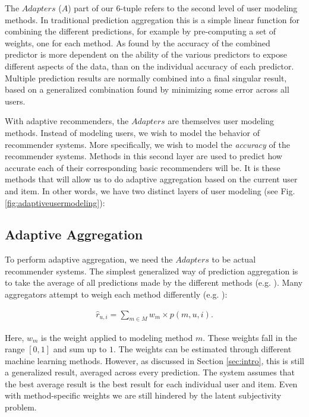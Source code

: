The $Adapters$ ($A$) part of our 6-tuple refers to the second level of user modeling methods.
In traditional prediction aggregation this is a simple linear function for combining the different predictions,
for example by pre-computing a set of weights, one for each method.
As found by \cite[p.6]{Bell2007} the accuracy of the combined predictor is more dependent on the 
ability of the various predictors to expose different aspects of the data, than on 
the individual accuracy of each predictor.
Multiple prediction results are normally combined into a final singular result,
based on a generalized combination found by minimizing some error across all users.

With adaptive recommenders, the $Adapters$ are themselves user modeling methods.
Instead of modeling users, we wish to model the behavior of recommender systems.
More specifically, we wish to model the \emph{accuracy} of the recommender systems.
Methods in this second layer are used to predict how accurate each of their corresponding basic recommenders will be.
It is these methods that will allow us to do adaptive aggregation based on the current user and item.
In other words, we have two distinct layers of user modeling 
(see Fig. \ref{fig:adaptiveusermodeling}):



\subsection{Adaptive Aggregation}

To perform adaptive aggregation, we need the $Adapters$ to be actual recommender systems.
The simplest generalized way of prediction aggregation is to take the average of all predictions made
by the different methods (e.g. \cite[p.3]{Aslam2001}).
Many aggregators attempt to weigh each method differently (e.g. \cite{Claypool1999}):

\begin{eqnarray*}
  \hat{r}_{u,i} = \sum_{m \in M} w_{m} \times p(m,u,i).
\end{eqnarray*}

Here, $w_m$ is the weight applied to modeling method $m$. 
These weights fall in the range $[0,1]$ and sum up to $1$.
The weights can be estimated through different machine learning methods.
However, as discussed in Section \ref{sec:intro},
this is still a generalized result, averaged across every prediction.
The system assumes that the best average result is the best result for each individual user and item.
Even with method-specific weights we are still hindered by the latent subjectivity problem.

